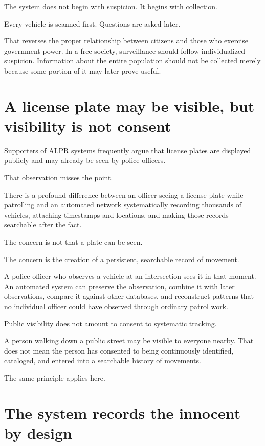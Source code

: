 \documentclass[11pt]{article}
\begin{document}
The system does not begin with suspicion. It begins with collection.

Every vehicle is scanned first. Questions are asked later.

That reverses the proper relationship between citizens and those who exercise government power. In a free society, surveillance should follow individualized suspicion. Information about the entire population should not be collected merely because some portion of it may later prove useful.

\section*{A license plate may be visible, but visibility is not consent}
\label{sec:org9611133}

Supporters of ALPR systems frequently argue that license plates are displayed publicly and may already be seen by police officers.

That observation misses the point.

There is a profound difference between an officer seeing a license plate while patrolling and an automated network systematically recording thousands of vehicles, attaching timestamps and locations, and making those records searchable after the fact.

The concern is not that a plate can be seen.

The concern is the creation of a persistent, searchable record of movement.

A police officer who observes a vehicle at an intersection sees it in that moment. An automated system can preserve the observation, combine it with later observations, compare it against other databases, and reconstruct patterns that no individual officer could have observed through ordinary patrol work.

Public visibility does not amount to consent to systematic tracking.

A person walking down a public street may be visible to everyone nearby. That does not mean the person has consented to being continuously identified, cataloged, and entered into a searchable history of movements.

The same principle applies here.

\section*{The system records the innocent by design}
\label{sec:orgdabc573}
\end{document}
